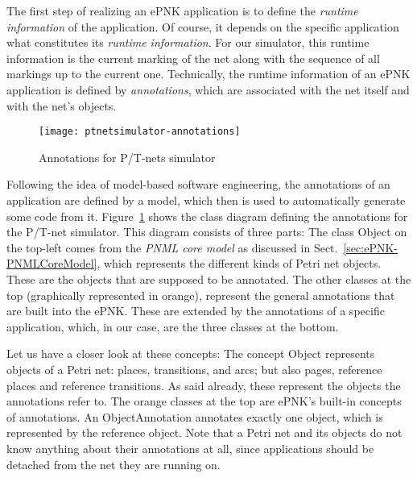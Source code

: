 The first step of realizing an ePNK application is to define the
\emph{runtime information} of the application. Of course, it depends on
the specific application what constitutes its \emph{runtime information}.
For our simulator, this runtime information is the current marking of the
net along with the sequence of all markings up to the current one. Technically,
the runtime information of an ePNK application is defined by \emph{annotations},
which are associated with the net itself and with the net's objects.

\begin{figure}[hbt!!]
  \centerline{\texttt{[image: ptnetsimulator-annotations]}}
  \caption{Annotations for P/T-nets simulator}
  \label{fig:developer:application:annotations:ptsimanno}
\end{figure}

Following the idea of model-based software engineering, the annotations of
an application are defined by a model, which then is used to automatically
generate some code from it.
Figure~\ref{fig:developer:application:annotations:ptsimanno} shows the
class diagram defining the annotations for the P/T-net simulator. This diagram
consists of three parts: The class {\sf Object} on the top-left comes from
the \emph{PNML core model} as discussed in Sect.~\ref{sec:ePNK-PNMLCoreModel},
which represents the different kinds of Petri net objects. These are
the objects that are supposed to be annotated. The other classes at the top
(graphically represented in orange), represent the general annotations that are built into
the ePNK. These are extended by the annotations of a specific application,
which, in our case, are the three classes at the bottom.

Let us have a closer look at these concepts: The concept {\sf Object} represents
{objects} of a Petri net: places,
transitions, and arcs; but also pages, reference places and reference
transitions. As said already, these represent the objects the annotations refer to.
The orange classes at the top are ePNK's built-in concepts of annotations.
An {\sf ObjectAnnotation} annotates exactly one object, which is
represented by the reference {\sf object}. Note that
a Petri net and its objects do not know anything about their annotations
at all, since applications should be detached from the net they are running
on. 

